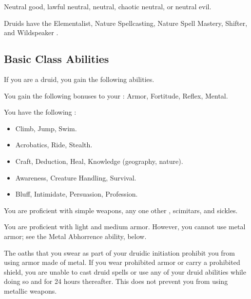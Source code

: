      Neutral good, lawful neutral, neutral, chaotic neutral, or neutral evil.

     Druids have the Elementalist, Nature Spellcasting, Nature Spell Mastery, Shifter, and Wildspeaker .

    \subsection{Basic Class Abilities}
        If you are a druid, you gain the following abilities.

        You gain the following bonuses to your :  Armor,  Fortitude,  Reflex,  Mental.

        You have the following :
        \begin{itemize}
            \item {} Climb, Jump, Swim.
            \item {} Acrobatics, Ride, Stealth.
            \item {} Craft, Deduction, Heal, Knowledge (geography, nature).
            \item {} Awareness, Creature Handling, Survival.
            \item {} Bluff, Intimidate, Persuasion, Profession.
        \end{itemize}

        You are proficient with simple weapons, any one other , scimitars, and sickles.

        You are proficient with light and medium armor.
        However, you cannot use metal armor; see the Metal Abhorrence ability, below.

        The oaths that you swear as part of your druidic initiation prohibit you from using armor made of metal.
        If you wear prohibited armor or carry a prohibited shield, you are unable to cast druid spells or use any of your  druid abilities while doing so and for 24 hours thereafter.
        This does not prevent you from using metallic weapons.

